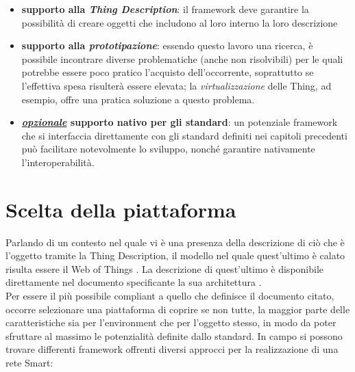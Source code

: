 \documentclass[12pt,a4paper,openright,oneside]{report}
\begin{document}
\begin{itemize}
	\setlength\itemsep{0em}
	\item \textbf{supporto alla \textit{Thing Description}}: il framework deve garantire la possibilità di creare oggetti che includono al loro interno la loro descrizione
	
	\item \textbf{supporto alla \textit{prototipazione}}: essendo questo lavoro una ricerca, è possibile incontrare diverse problematiche (anche non risolvibili) per le quali potrebbe essere poco pratico l'acquisto dell'occorrente, soprattutto se l'effettiva spesa risulterà essere elevata; la \textit{virtualizzazione} delle Thing, ad esempio, offre una pratica soluzione a questo problema.
	
	\item \textbf{\ul{\textit{opzionale}} supporto nativo per gli standard}: un potenziale framework che si interfaccia direttamente con gli standard definiti nei capitoli precedenti può facilitare notevolmente lo sviluppo, nonché garantire nativamente l'interoperabilità.
\end{itemize}

\section{Scelta della piattaforma}
Parlando di un contesto nel quale vi è una presenza della descrizione di ciò che è l'oggetto tramite la Thing Description, il modello nel quale quest'ultimo è calato risulta essere il Web of Things \cite{wot}. La descrizione di quest'ultimo è disponibile direttamente nel documento specificante la sua architettura \cite{wot-architecture}.\\

Per essere il più possibile compliant a quello che definisce il documento citato, occorre selezionare una piattaforma di coprire se non tutte, la maggior parte delle caratteristiche sia per l'environment che per l'oggetto stesso, in modo da poter sfruttare al massimo le potenzialità definite dallo standard. In campo si possono trovare differenti framework offrenti diversi approcci per la realizzazione di una rete Smart:
\end{document}
